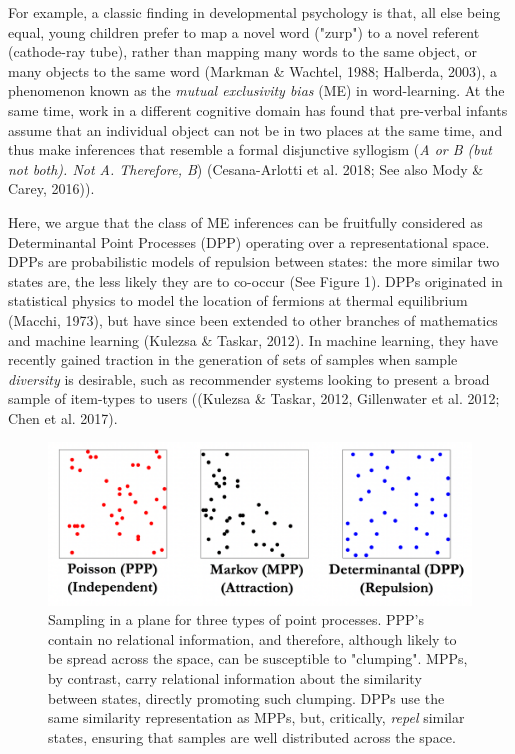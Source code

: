 \documentclass[10pt,letterpaper]{article}
\begin{document}
For example, a classic finding in developmental psychology is that, all else being equal, young children prefer to map a novel word ("zurp") to a novel referent (cathode-ray tube), rather than mapping many words to the same object, or many objects to the same word (Markman \& Wachtel, 1988; Halberda, 2003), a phenomenon known as the \textit{mutual exclusivity bias} (ME) in word-learning. At the same time, work in a different cognitive domain has found that pre-verbal infants assume that an individual object can not be in two places at the same time, and thus make inferences that resemble a formal disjunctive syllogism (\textit{A or B (but not both). Not A. Therefore, B}) (Cesana-Arlotti et al. 2018; See also Mody \& Carey, 2016)). 
 
 
Here, we argue that the class of ME inferences can be fruitfully considered as Determinantal Point Processes (DPP) operating over a representational space. DPPs are probabilistic models of repulsion between states: the more similar two states are, the less likely they are to co-occur (See Figure 1). DPPs originated in statistical physics to model the location of fermions at thermal equilibrium (Macchi, 1973), but have since been extended to other branches of mathematics and machine learning (Kulezsa \& Taskar, 2012). In machine learning, they have recently gained traction in the generation of sets of samples when sample \textit{diversity} is desirable, such as recommender systems looking to present a broad sample of item-types to users ((Kulezsa \& Taskar, 2012, Gillenwater et al. 2012; Chen et al. 2017). 

 \begin{figure}[h]
  \centering \includegraphics[width=1\columnwidth]{Figure1.png}
  \caption{Sampling in a plane for three types of point processes. PPP’s contain no relational information, and therefore, although likely to be spread across the space, can be susceptible to "clumping". MPPs, by contrast, carry relational information about the similarity between states, directly promoting such clumping. DPPs use the same similarity representation as MPPs, but, critically, \textit{repel} similar states, ensuring that samples are well distributed across the space.
}
\end{figure}
\end{document}
